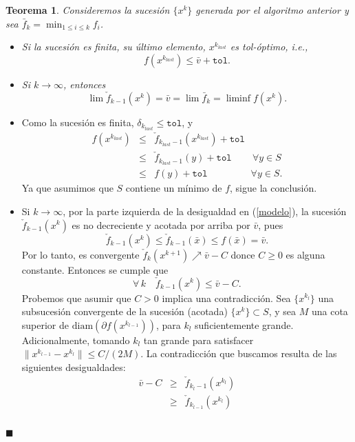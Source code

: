 \documentclass[a4paper,12pt]{report}
\newcommand{\bx}{\bar{x}}
\newcommand{\arr}{\rightarrow}
\newtheorem{teo}{Teorema}[section]
\newenvironment{dem}{\vspace*{-0.1cm}{\it Demostraci\'on:}}{\hfill
$\blacksquare$\\}
\begin{document}
\begin{teo}
Consideremos la sucesi\'on $\{x^k\}$ generada por el algoritmo anterior y sea $\displaystyle\bar{f}_k=\min_{1\leq i\leq k}f_i$.
\begin{itemize}
\item[(i)] Si la sucesi\'on es finita, su \'ultimo elemento, $x^{k_{last}}$ es tol-\'optimo, i.e.,
$$f(x^{k_{last}})\leq\bar{v}+\mathtt{tol}.$$
\item[(ii)] Si $k\arr\infty$, entonces
$$\lim\check{f}_{k-1}(x^k)=\bar{v}=\lim\bar{f}_k=\liminf f(x^k).$$
\end{itemize}
\end{teo}
\begin{dem}
\begin{itemize}
\item[{\it (i)}] Como la sucesi\'on es finita, $\delta_{k_{last}}\leq\mathtt{tol}$, y 
\begin{eqnarray}
f(x^{k_{last}})&\leq&\check{f}_{k_{last}-1}(x^{k_{last}})+\mathtt{tol}\\
&\leq&\check{f}_{k_{last}-1}(y)+\mathtt{tol}\qquad\, \forall y\in S\\
&\leq&f(y)+\mathtt{tol}\qquad\qquad\,\,\, \forall y\in S.
\end{eqnarray}
Ya que asumimos que $S$ contiene un m\'inimo de $f$, sigue la conclusi\'on.
\item[{\it (ii)}] Si $k\arr\infty$, por la parte izquierda de la desigualdad en (\ref{modelo}), la sucesi\'on $\check{f}_{k-1}(x^k)$ es no decreciente y acotada por arriba por $\bar{v}$, pues $$\check{f}_{k-1}(x^k)\leq \check{f}_{k-1}(\bx)\leq f(\bx)=\bar{v}.$$ Por lo tanto, es convergente $\check{f}_k(x^{k+1})\nearrow\bar{v}-C$ donce $C\geq 0$ es alguna constante. Entonces se cumple que
\begin{equation}
\forall\,k\quad\check{f}_{k-1}(x^k)\leq\bar{v}-C.
\end{equation}
Probemos que asumir que $C>0$ implica una contradicci\'on. Sea $\{x^{k_l}\}$ una subsucesi\'on convergente de la sucesi\'on (acotada) $\{x^k\}\subset S$, y sea $M$ una cota superior de $\mathrm{diam}(\partial f(x^{k_{l-1}}))$, para $k_l$ suficientemente grande. Adicionalmente, tomando $k_l$ tan grande para satisfacer $\|x^{k_{l-1}}-x^{k_l}\|\leq C/(2M)$. La contradicci\'on que buscamos resulta de las siguientes desigualdades:
\begin{eqnarray*}
\bar{v}-C&\geq&\check{f}_{k_l-1}(x^{k_l})\\
&\geq&\check{f}_{k_{l-1}}(x^{k_l})\\

\end{eqnarray*}
\end{itemize}
\end{dem}
\end{document}
